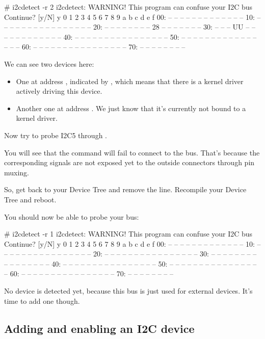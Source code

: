 \begin{bashinput}
# i2cdetect -r 2
i2cdetect: WARNING! This program can confuse your I2C bus
Continue? [y/N] y
     0  1  2  3  4  5  6  7  8  9  a  b  c  d  e  f
00:          -- -- -- -- -- -- -- -- -- -- -- -- --
10: -- -- -- -- -- -- -- -- -- -- -- -- -- -- -- --
20: -- -- -- -- -- -- -- -- 28 -- -- -- -- -- -- --
30: -- -- -- UU -- -- -- -- -- -- -- -- -- -- -- --
40: -- -- -- -- -- -- -- -- -- -- -- -- -- -- -- --
50: -- -- -- -- -- -- -- -- -- -- -- -- -- -- -- --
60: -- -- -- -- -- -- -- -- -- -- -- -- -- -- -- --
70: -- -- -- -- -- -- -- --
\end{bashinput}

We can see two devices here:
\begin{itemize}
\item One at address , indicated by ,
      which means that there is a kernel driver actively
      driving this device.
\item Another one at address . We just know that
      it's currently not bound to a kernel driver.
\end{itemize}

Now try to probe I2C5 through .

You will see that the command will fail to connect to
the bus. That's because the corresponding signals are
not exposed yet to the outside connectors through pin muxing.

So, get back to your Device Tree and remove the 
line. Recompile your Device Tree and reboot.

You should now be able to probe your bus:

\begin{bashinput}
# i2cdetect -r 1
i2cdetect: WARNING! This program can confuse your I2C bus
Continue? [y/N] y
     0  1  2  3  4  5  6  7  8  9  a  b  c  d  e  f
00:          -- -- -- -- -- -- -- -- -- -- -- -- --
10: -- -- -- -- -- -- -- -- -- -- -- -- -- -- -- --
20: -- -- -- -- -- -- -- -- -- -- -- -- -- -- -- --
30: -- -- -- -- -- -- -- -- -- -- -- -- -- -- -- --
40: -- -- -- -- -- -- -- -- -- -- -- -- -- -- -- --
50: -- -- -- -- -- -- -- -- -- -- -- -- -- -- -- --
60: -- -- -- -- -- -- -- -- -- -- -- -- -- -- -- --
70: -- -- -- -- -- -- -- --
\end{bashinput}

No device is detected yet, because this bus is just
used for external devices. It's time to add one though.

\subsection{Adding and enabling an I2C device}

